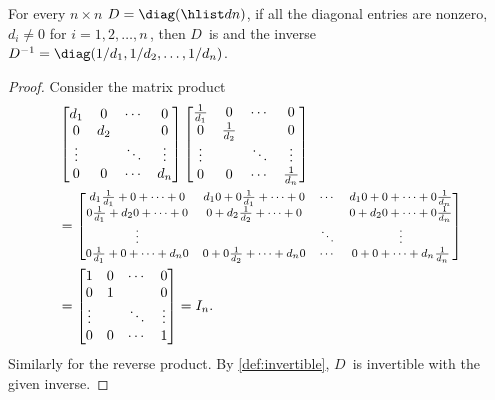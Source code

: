 \begin{theorem} \label{thm:idm}
For every \(n\times n\)   \(D=\diag(\hlist dn)\), 
if all the diagonal entries are nonzero, \(d_{i}\neq 0\) for \(i=1,2,\ldots,n\)\,, then \(D\)~is  and the inverse \(D^{-1}=\diag(1/d_{1},1/d_{2},\ldots,1/d_{n})\).
\end{theorem}
\begin{proof} 
Consider the matrix product 
\begin{align*}&
\begin{bmatrix} d_1&0&\cdots&0
\\0&d_2&&0
\\\vdots&&\ddots&\vdots
\\0&0&\cdots&d_n \end{bmatrix}
\begin{bmatrix} \frac1{d_1}&0&\cdots&0
\\0&\frac1{d_2}&&0
\\\vdots&&\ddots&\vdots
\\0&0&\cdots&\frac1{d_n} \end{bmatrix}
\\&=
\footnotesize%
\begin{bmatrix} d_1\frac1{d_1}+0+\cdots+0
&d_10+0\frac1{d_1}+\cdots+0
&\cdots&d_10+0+\cdots+0\frac1{d_n}
\\0\frac1{d_1}+d_20+\cdots+0
&0+d_2\frac1{d_2}+\cdots+0
&&0+d_20+\cdots+0\frac1{d_n}
\\\vdots&&\ddots&\vdots
\\0\frac1{d_1}+0+\cdots+d_n0
&0+0\frac1{d_2}+\cdots+d_n0
&\cdots&0+0+\cdots+d_n\frac1{d_n} \end{bmatrix}
\\&=\begin{bmatrix} 1&0&\cdots&0
\\0&1&&0
\\\vdots&&\ddots&\vdots
\\0&0&\cdots&1 \end{bmatrix}=I_n.
\end{align*}
Similarly for the reverse product.
By \autoref{def:invertible}, \(D\)~is invertible with the given inverse.
\end{proof}

